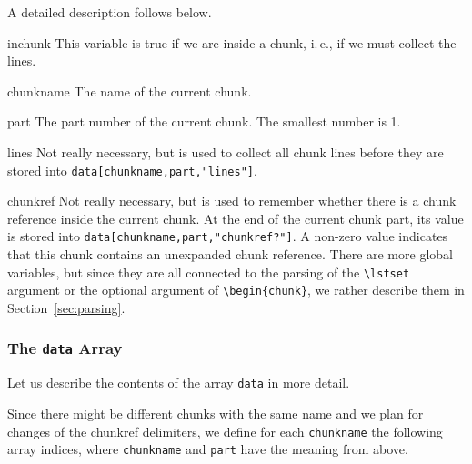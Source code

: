 \documentclass[a4paper]{article} %
\newcommand{\ie}{i.\,e.}
\newenvironment{ttdescription}
  {\list{}{\labelwidth0pt \itemindent-\leftmargin
      \def\makelabel##1{\hspace\labelsep
        \normalfont\ttfamily ##1:}}}
  {\endlist}
\begin{document}
\begin{ttdescription}
A detailed description follows below.

\item[inchunk] This variable is true if we are inside a chunk, \ie, if
  we must collect the lines.

\item[chunkname] The name of the current chunk.

\item[part] The part number of the current chunk. The smallest number
  is 1.

\item[lines] Not really necessary, but is used to collect all chunk
  lines before they are stored into
  \texttt{data[chunkname,part,"lines"]}.

\item[chunkref] Not really necessary, but is used to remember whether
  there is a chunk reference inside the current chunk. At the end of
  the current chunk part, its value is stored into
  \texttt{data[chunkname,part,"chunkref?"]}.
%
  A non-zero value indicates that this chunk contains an unexpanded
  chunk reference.
\end{ttdescription}
There are more global variables, but since they are all connected to
the parsing of the \verb'\lstset' argument or the optional argument of
\verb'\'\verb'begin{chunk}', we rather describe them in
Section~\ref{sec:parsing}.


\subsubsection{The \texttt{data} Array}
Let us describe the contents of the array \texttt{data} in more
detail.

Since there might be different chunks with the same name and we plan
for changes of the chunkref delimiters, we define for each
\texttt{chunkname} the following array indices, where
\texttt{chunkname} and \texttt{part} have the meaning from above.
\end{document}

